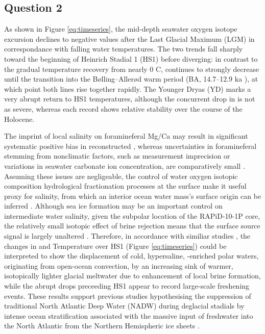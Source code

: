 \subsection{Question 2}
As shown in Figure \ref{eq:timeseries}, the mid-depth seawater oxygen isotope excursion  declines to negative values after the Last Glacial Maximum (LGM) in correspondance with falling water temperatures.
The two trends fall sharply toward the beginning of Heinrich Stadial 1 (HS1) before diverging: in contrast to the gradual temperature recovery from nearly 0 \degree{}C,  continues to strongly decrease until the transition into the Bølling–Allerød warm period (BA, 14.7–12.9 ka \parencite{thornalley2011reconstructing}), at which point both lines rise together rapidly.
The Younger Dryas (YD) marks a very abrupt return to HS1 temperatures, although the concurrent drop in  is not as severe, whereas each record shows relative stability over the course of the Holocene.

The imprint of local salinity on foramineferal Mg/Ca may result in significant systematic positive bias in reconstructed  \parencite{mathien2009salinity}, whereas uncertainties in foramineferal  stemming from nonclimatic factors, such as measurement imprecision or variations in seawater carbonate ion concentration, are comparatively small \parencite{bell2014local}. 
Assuming these issues are negligeable, the control of water oxygen isotopic composition hydrological fractionation processes at the surface make it useful proxy for salinity, from which an interior ocean water mass's surface origin can be inferred \parencite{ravelo2007use, lynch2014tracers}.
Although sea ice formation may be an important control on intermediate water salinity, given the subpolar location of the RAPiD-10-1P core, the relatively small isotopic effect of brine rejection means that the surface source  signal is largely unaltered \parencite{waelbroeck2011timing}. 
Therefore, in accordance with similiar studies \parencite[e.g.][]{thornalley2010intermediate, thornalley2011reconstructing}, the changes in  and Temperature over HS1 (Figure \ref{eq:timeseries}) could be interpreted to show the displacement of cold, hypersaline, \delO{}-enriched polar waters, originating from open-ocean convection, by an increasing sink of warmer, isotopically lighter glacial meltwater due to enhancement of local brine formation, while the abrupt drops preceeding HS1 appear to record large-scale freshening events.
These results support previous studies hypothesising the suppression of traditional North Atlantic Deep Water (NADW) during deglacial stadials by intense ocean stratification associated with the massive input of freshwater into the North Atlantic from the Northern Hemispheric ice sheets \parencite{vidal1998benthic, dokken1999rapid}.

